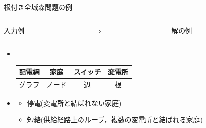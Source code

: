 \begin{frame}{根付き全域森問題の例}
  \begin{columns}
    \begin{column}{0.45\textwidth}\centering
      \begin{exampleblock}{入力例}
	\centering
	
      \end{exampleblock}
    \end{column}
    \begin{column}{0.05\textwidth}\centering
      $\Rightarrow$
    \end{column}
    \begin{column}{0.45\textwidth}\centering
      \begin{exampleblock}{解の例}
        \centering
        
      \end{exampleblock}
    \end{column}
  \end{columns}
  \vfill
  \begin{itemize}
  \item {} \\
	 \begin{center}
      \begin{minipage}[c]{0.6\textwidth}
	   \begin{block}{}
		\centering
		\begin{tabular}{c|ccc}
		配電網 & 家庭 & スイッチ & 変電所 \\
		\hline
		グラフ & ノード & 辺 & 根
		\end{tabular}
	   \end{block}
      \end{minipage}
	 \end{center}\vfill
   \item {}
		 \begin{itemize}
		  \item 停電(変電所と結ばれない家庭)
		  \item 短絡(供給経路上のループ，複数の変電所と結ばれる家庭)
		 \end{itemize}
  \end{itemize}
\end{frame}

